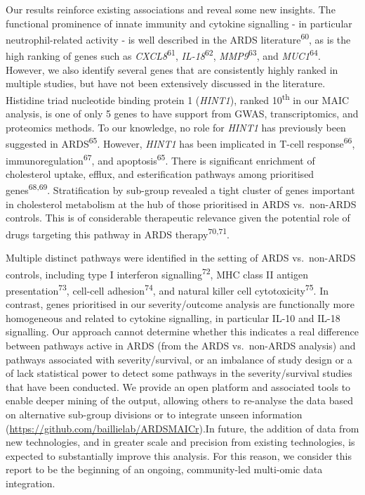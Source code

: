 \documentclass[
  11,
  a4paper,
]{article}
\begin{document}
Our results reinforce existing associations and reveal some new
insights. The functional prominence of innate immunity and cytokine
signalling - in particular neutrophil-related activity - is well
described in the ARDS literature\textsuperscript{60}, as is the high
ranking of genes such as \emph{CXCL8}\textsuperscript{61},
\emph{IL-18}\textsuperscript{62}, \emph{MMP9}\textsuperscript{63}, and
\emph{MUC1}\textsuperscript{64}. However, we also identify several genes
that are consistently highly ranked in multiple studies, but have not
been extensively discussed in the literature. Histidine triad nucleotide
binding protein 1 (\emph{HINT1}), ranked 10\textsuperscript{th} in our
MAIC analysis, is one of only 5 genes to have support from GWAS,
transcriptomics, and proteomics methods. To our knowledge, no role for
\emph{HINT1} has previously been suggested in ARDS\textsuperscript{65}.
However, \emph{HINT1} has been implicated in T-cell
response\textsuperscript{66}, immunoregulation\textsuperscript{67}, and
apoptosis\textsuperscript{65}. There is significant enrichment of
cholesterol uptake, efflux, and esterification pathways among
prioritised genes\textsuperscript{68,69}. Stratification by sub-group
revealed a tight cluster of genes important in cholesterol metabolism at
the hub of those prioritised in ARDS vs.~non-ARDS controls. This is of
considerable therapeutic relevance given the potential role of drugs
targeting this pathway in ARDS therapy\textsuperscript{70,71}.

Multiple distinct pathways were identified in the setting of ARDS
vs.~non-ARDS controls, including type I interferon
signalling\textsuperscript{72}, MHC class II antigen
presentation\textsuperscript{73}, cell-cell
adhesion\textsuperscript{74}, and natural killer cell
cytotoxicity\textsuperscript{75}. In contrast, genes prioritised in our
severity/outcome analysis are functionally more homogeneous and related
to cytokine signalling, in particular IL-10 and IL-18 signalling. Our
approach cannot determine whether this indicates a real difference
between pathways active in ARDS (from the ARDS vs.~non-ARDS analysis)
and pathways associated with severity/survival, or an imbalance of study
design or a of lack statistical power to detect some pathways in the
severity/survival studies that have been conducted. We provide an open
platform and associated tools to enable deeper mining of the output,
allowing others to re-analyse the data based on alternative sub-group
divisions or to integrate unseen information
(\url{https://github.com/baillielab/ARDSMAICr}).In future, the addition
of data from new technologies, and in greater scale and precision from
existing technologies, is expected to substantially improve this
analysis. For this reason, we consider this report to be the beginning
of an ongoing, community-led multi-omic data integration.
\end{document}
